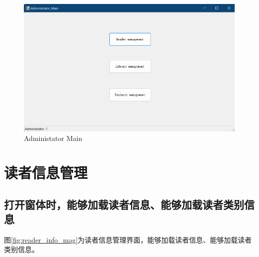 \documentclass{article}
\begin{document}
\begin{figure}[H]
    \centering
    \includegraphics[width=1\textwidth]{../pic/admin_main.png}
    \caption{Administator Main}
    \label{fig:admin_main}
\end{figure}


\section{读者信息管理}

\subsection{打开窗体时，能够加载读者信息、能够加载读者类别信息}
图\ref{fig:reader_info_mag}为读者信息管理界面，能够加载读者信息、能够加载读者类别信息。
\end{document}
